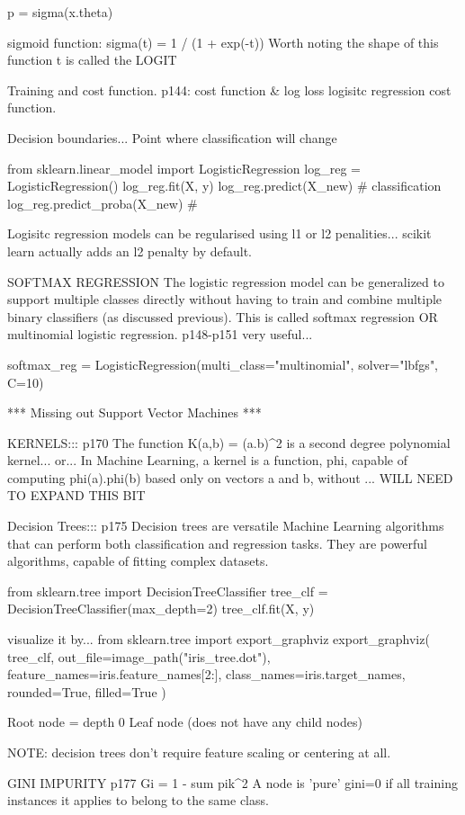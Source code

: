 p = sigma(x.theta)

sigmoid function:
sigma(t) = 1 / (1 + exp(-t))
Worth noting the shape of this function
t is called the LOGIT

Training and cost function.
p144: cost function & log loss logisitc regression cost function.

Decision boundaries...
Point where classification will change

from sklearn.linear_model import LogisticRegression
log_reg = LogisticRegression()
log_reg.fit(X, y)
log_reg.predict(X_new) # classification
log_reg.predict_proba(X_new) # 

Logisitc regression models can be regularised using l1 or l2 penalities...
scikit learn actually adds an l2 penalty by default.

SOFTMAX REGRESSION
The logistic regression model can be generalized to support multiple classes directly
without having to train and combine multiple binary classifiers (as discussed previous).
This is called softmax regression OR multinomial logistic regression.
p148-p151 very useful...

softmax_reg = LogisticRegression(multi_class="multinomial", solver="lbfgs", C=10)

*** Missing out Support Vector Machines ***

KERNELS:::
p170
The function K(a,b) = (a.b)^2
is a second degree polynomial kernel...
or...
In Machine Learning,
a kernel is a function, phi,
capable of computing phi(a).phi(b)
based only on vectors a and b,
without ...
WILL NEED TO EXPAND THIS BIT

Decision Trees::: p175
Decision trees are versatile Machine Learning algorithms
that can perform both classification and regression tasks.
They are powerful algorithms, capable of fitting complex datasets.

from sklearn.tree import DecisionTreeClassifier
tree_clf = DecisionTreeClassifier(max_depth=2)
tree_clf.fit(X, y)

visualize it by...
from sklearn.tree import export_graphviz
export_graphviz(
    tree_clf,
    out_file=image_path("iris_tree.dot"),
    feature_names=iris.feature_names[2:],
    class_names=iris.target_names,
    rounded=True,
    filled=True
)

Root node = depth 0
Leaf node (does not have any child nodes)

NOTE:
decision trees don't require feature scaling or centering at all.

GINI IMPURITY
p177
Gi = 1 - sum pik^2
A node is 'pure' gini=0
if all training instances it applies to belong to the same class.

